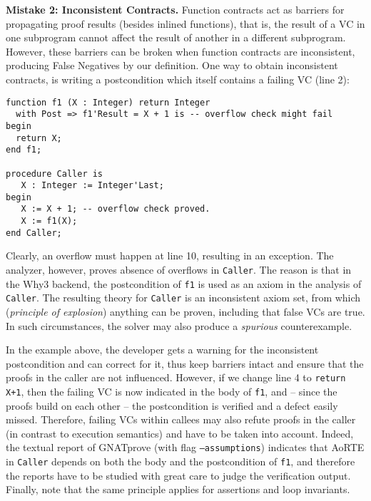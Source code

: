 \textbf{Mistake 2: Inconsistent Contracts.} Function contracts act as
barriers for propagating proof results (besides inlined
functions), that is, the result of a VC in one subprogram cannot affect the result of another in a different subprogram. However, these barriers can be broken when function
contracts are inconsistent, producing False Negatives by our definition. One way to obtain inconsistent contracts, is writing a postcondition which itself contains a failing VC (line 2):
\begin{lstlisting}[name=postvc]
function f1 (X : Integer) return Integer 
  with Post => f1'Result = X + 1 is -- overflow check might fail
begin 
  return X;
end f1;

procedure Caller is
   X : Integer := Integer'Last;
begin
   X := X + 1; -- overflow check proved.
   X := f1(X);
end Caller;
\end{lstlisting}
Clearly, an overflow must happen at line 10, resulting in
an exception. The analyzer, however, proves absence of overflows in
\lstinline$Caller$. The reason is that in the Why3 backend, the
postcondition of \lstinline$f1$ is used as an axiom in the analysis of
\lstinline{Caller}. The resulting theory for \lstinline{Caller} is an
inconsistent axiom set, from which (\emph{principle of explosion})
anything can be proven, including that false VCs are true. In such
circumstances, the solver may
also produce a \emph{spurious} counterexample. 

In the example above, the developer gets a warning for the
inconsistent postcondition and can correct for it, thus keep barriers
intact and ensure that the proofs in the caller are not
influenced. However, if we change line 4 to \lstinline{return X+1}, then the
failing VC is now indicated in the body of \lstinline{f1}, and -- since the
proofs build on each other -- the postcondition is verified and a
defect easily missed. Therefore, failing VCs within callees may also
refute proofs in the caller (in contrast to execution semantics) and
have to be taken into account. Indeed, the textual report of GNATprove (with flag
\texttt{--assumptions}) indicates that AoRTE in \lstinline{Caller} depends on both
the body and the postcondition of \lstinline{f1}, and therefore the reports have to be studied with great care to judge the verification output.
Finally, note that the same principle applies for assertions and loop invariants.


